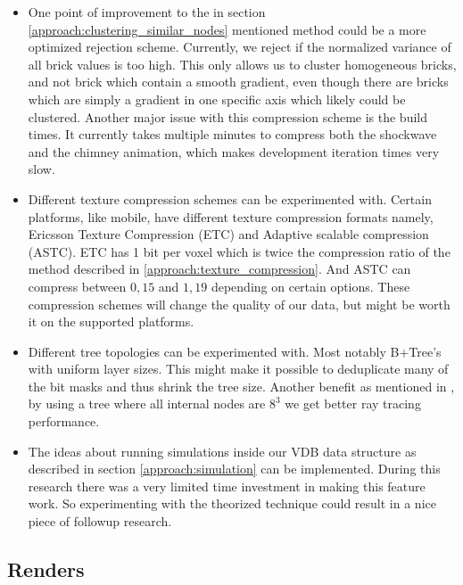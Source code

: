 \begin{itemize}
    \item One point of improvement to the in section \ref{approach:clustering_similar_nodes} mentioned method could be a more optimized rejection scheme. Currently, we reject if the normalized variance of all brick values is too high. This only allows us to cluster homogeneous bricks, and not brick which contain a smooth gradient, even though there are bricks which are simply a gradient in one specific axis which likely could be clustered. Another major issue with this compression scheme is the build times. It currently takes multiple minutes to compress both the shockwave and the chimney animation, which makes development iteration times very slow.
    \item Different texture compression schemes can be experimented with. Certain platforms, like mobile, have different texture compression formats namely, Ericsson Texture Compression (ETC) and Adaptive scalable compression (ASTC). ETC has 1 bit per voxel which is twice the compression ratio of the method described in \ref{approach:texture_compression}. And ASTC can compress between $0,15$ and $1,19$ depending on certain options. These compression schemes will change the quality of our data, but might be worth it on the supported platforms.
    \item Different tree topologies can be experimented with. Most notably B+Tree's with uniform layer sizes. This might make it possible to deduplicate many of the bit masks and thus shrink the tree size. Another benefit as mentioned in \cite{hoetzlein2016gvdb}, by using a tree where all internal nodes are $8^3$ we get better ray tracing performance.
    \item The ideas about running simulations inside our VDB data structure as described in section \ref{approach:simulation} can be implemented. During this research there was a very limited time investment in making this feature work. So experimenting with the theorized technique could result in a nice piece of followup research.
\end{itemize}

\subsection{Renders}

